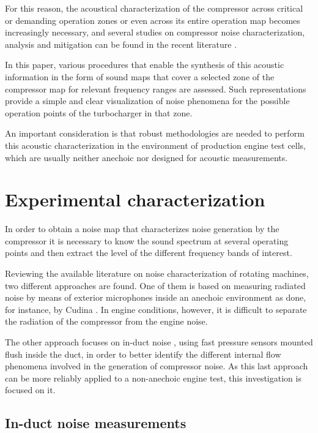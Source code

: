 For this reason, the acoustical characterization of the compressor across critical or demanding operation zones or even across its entire operation map becomes increasingly necessary, and several studies on compressor noise characterization, analysis and mitigation can be found in the recent literature \cite{evans2005minimizing,soh2003noise,teng2009investigation}.

In this paper, various procedures that enable the synthesis of this acoustic information in the form of sound maps that cover a selected zone of the compressor map for relevant frequency ranges are assessed. Such representations provide a simple and clear visualization of noise phenomena for the possible operation points of the turbocharger in that zone.

An important consideration is that robust methodologies are needed to perform this acoustic characterization in the environment of production engine test cells, which are usually neither anechoic nor designed for acoustic measurements.

\section{Experimental characterization}
\label{sec:experimental_characterization}

In order to obtain a noise map that characterizes noise generation by the compressor it is necessary to know the sound spectrum at several operating points and then extract the level of the different frequency bands of interest.

Reviewing the available literature on noise characterization of rotating machines, two different approaches are found. One of them is based on measuring radiated noise by means of exterior microphones inside an anechoic environment as done, for instance, by Cudina \cite{cudina2000noise}. In engine conditions, however, it is difficult to separate the radiation of the compressor from the engine noise.

The other approach focuses on in-duct noise \cite{tiikoja2011inves}, using fast pressure sensors mounted flush inside the duct, in order to better identify the different internal flow phenomena involved in the generation of compressor noise. As this last approach can be more reliably applied to a non-anechoic engine test, this investigation is focused on it.

\subsection{In-duct noise measurements}
\label{sub:in_duct_noise_measurements}

